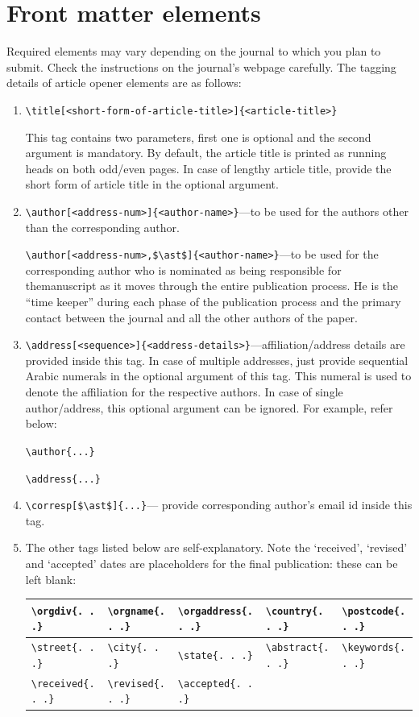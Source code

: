 \documentclass{article}
\begin{document}
\section{Front matter elements }
Required elements may vary depending on the journal to which you plan to submit. Check the instructions on the journal's webpage carefully. The tagging details of article opener elements are as follows:
\begin{enumerate}
\item \verb+\title[<short-form-of-article-title>]{<article-title>} +

This tag contains two parameters, first one is optional and the second argument is mandatory. By default, the article title is printed as running heads on both odd/even pages. In case of lengthy article title, provide the short form of article title in the optional argument.

\item \verb+\author[<address-num>]{<author-name>}+---to be used for the authors other than the corresponding author.

\verb+\author[<address-num>,$\ast$]{<author-name>}+---to be used for the corresponding author who is nominated as being responsible for the\break manuscript as it moves through the entire publication process. He is the ``time keeper'' during each phase of the publication process and the primary contact between the journal and all the other authors of the paper.

\item \verb+\address[<sequence>]{<address-details>}+---affiliation/address details are provided inside this tag. In case of multiple addresses, just provide sequential Arabic numerals in the optional argument of this tag. This numeral is used to denote the affiliation for the respective authors. In case of single author/address, this optional argument can be ignored. For example, refer below:

\verb+\author{...}+

\verb+\address{...}+

\item \verb+\corresp[$\ast$]{...}+--- provide corresponding author's email id inside this tag.

\item The other tags listed below are self-explanatory. Note the `received', `revised' and `accepted' dates are placeholders for the final publication: these can be left blank:

{\fontsize{7}{10}\selectfont\begin{tabular}{|l|l|l|l|l|}
\hline \verb+\orgdiv{. . .}+ & \verb+\orgname{. . .}+ &
\verb+\orgaddress{. . .}+ & \verb+\country{. . .}+ &
\verb+\postcode{. . .}+ \\ \hline \verb+\street{. . .}+ &
\verb+\city{. . .}+ & \verb+\state{. . .}+ & \verb+\abstract{. . .}+
& \verb+\keywords{. . .}+ \\ \hline \verb+\received{. . .}+ &
\verb+\revised{. . .}+ & \verb+\accepted{. . .}+ &  &  \\ \hline
\end{tabular}}


\end{enumerate}
\end{document}
